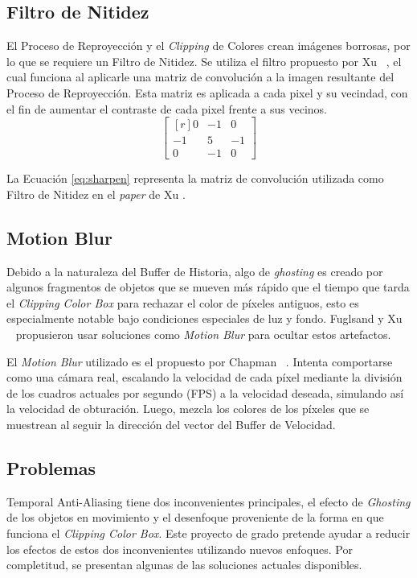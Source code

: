 \documentclass[pregrado]{tesis-usb} %
\begin{document}
\subsection{Filtro de Nitidez} 
El Proceso de Reproyección y el \textit{Clipping} de Colores crean imágenes borrosas, por lo que se requiere un Filtro de Nitidez. Se utiliza el filtro propuesto por Xu ~\cite{XU2016}, el cual funciona al aplicarle una matriz de convolución a la imagen resultante del Proceso de Reproyección. Esta matriz es aplicada a cada pixel y su vecindad, con el fin de aumentar el contraste de cada pixel frente a sus vecinos. 
\begin{equation} \label{eq:sharpen}
\begin{bmatrix*}[r]
0 & -1 &  0 \\
-1 &  5 & -1 \\
0 & -1 &  0
\end{bmatrix*}
\end{equation}

La Ecuación \ref{eq:sharpen} representa la matriz de convolución utilizada como Filtro de Nitidez en el \textit{paper} de Xu \protect\cite{XU2016}. 

\subsection{Motion Blur}
Debido a la naturaleza del Buffer de Historia, algo de \textit{ghosting} es creado por algunos fragmentos de objetos que se mueven más rápido que el tiempo que tarda el \textit{Clipping Color Box} para rechazar el color de píxeles antiguos, esto es especialmente notable bajo condiciones especiales de luz y fondo. Fuglsand y Xu ~\cite{Fuglsand2016, XU2016} propusieron usar soluciones como \textit{Motion Blur} para ocultar estos artefactos.

El \textit{Motion Blur} utilizado es el propuesto por Chapman ~\cite{Chapman2012}. Intenta comportarse como una cámara real, escalando la velocidad de cada píxel mediante la división de los cuadros actuales por segundo (FPS) a la velocidad deseada, simulando así la velocidad de obturación. Luego, mezcla los colores de los píxeles que se muestrean al seguir la dirección del vector del Buffer de Velocidad.


\subsection{Problemas}
Temporal Anti-Aliasing tiene dos inconvenientes principales, el efecto de \textit{Ghosting} de los objetos en movimiento y el desenfoque proveniente de la forma en que funciona el \textit{Clipping Color Box}. Este proyecto de grado pretende ayudar a reducir los efectos de estos dos inconvenientes utilizando nuevos enfoques. Por completitud, se presentan algunas de las soluciones actuales disponibles.
\end{document}
